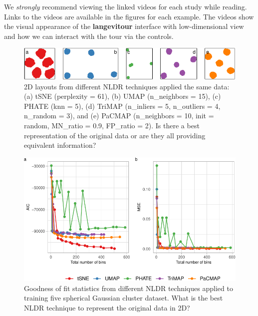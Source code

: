 \documentclass[
  12pt]{article}
\begin{document}
We \emph{strongly} recommend viewing the linked videos for each study
while reading. Links to the videos are available in the figures for each
example. The videos show the visual appearance of the
\textbf{langevitour} interface with low-dimensional view and how we can
interact with the tour via the controls.

\begin{figure}

{\centering \includegraphics[width=1\textwidth,height=\textheight]{paper_files/figure-pdf/fig-nldervis5Gau-1.pdf}

}

\caption{\label{fig-nldervis5Gau}2D layouts from different NLDR
techniques applied the same data: (a) tSNE (perplexity = 61), (b) UMAP
(n\_neighbors = 15), (c) PHATE (knn = 5), (d) TriMAP (n\_inliers = 5,
n\_outliers = 4, n\_random = 3), and (e) PaCMAP (n\_neighbors = 10, init
= random, MN\_ratio = 0.9, FP\_ratio = 2). Is there a best
representation of the original data or are they all providing equivalent
information?}

\end{figure}

\begin{figure}

{\centering \includegraphics[width=1\textwidth,height=\textheight]{paper_files/figure-pdf/fig-diagnosticpltGau-1.pdf}

}

\caption{\label{fig-diagnosticpltGau}Goodness of fit statistics from
different NLDR techniques applied to training five spherical Gaussian
cluster dataset. What is the best NLDR technique to represent the
original data in 2D?}

\end{figure}
\end{document}
